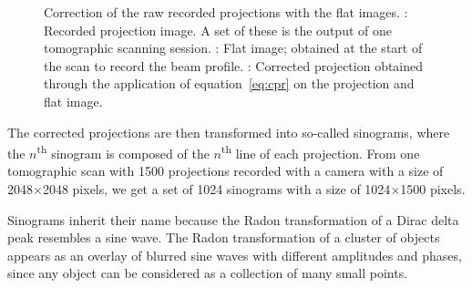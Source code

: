 \begin{figure}[h]
{		\label{subfig:fi}%
		}%
	\caption{Correction of the raw recorded projections with the flat images. : Recorded projection image. A set of these is the output of one tomographic scanning session. : Flat image; obtained at the start of the scan to record the beam profile. : Corrected projection obtained through the application of equation~\ref{eq:cpr} on the projection and flat image.}
	\label{fig:corrected projection}
\end{figure}

The corrected projections are then transformed into so-called sinograms, where the $n$\textsuperscript{th} sinogram is composed of the $n$\textsuperscript{th} line of each projection. From one tomographic scan with 1500 projections recorded with a camera with a size of 2048$\times$2048 pixels, we get a set of 1024 sinograms with a size of 1024$\times$1500 pixels.

Sinograms inherit their name because the Radon transformation of a Dirac delta peak resembles a sine wave. The Radon transformation of a cluster of objects appears as an overlay of blurred sine waves with different amplitudes and phases, since any object  can be considered as a collection of many small points.

